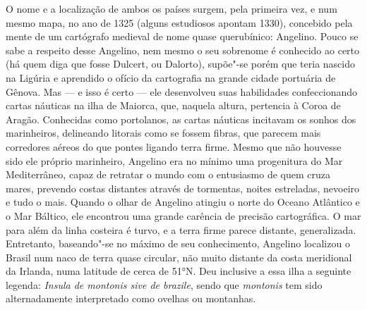 O nome e a localização de ambos os países surgem, pela primeira vez, e
num mesmo mapa, no ano de 1325 (alguns estudiosos apontam 1330),
concebido pela mente de um cartógrafo medieval de nome quase
querubínico: Angelino. Pouco se sabe a respeito desse Angelino, nem
mesmo o seu sobrenome é conhecido ao certo (há quem diga que fosse
Dulcert, ou Dalorto), supõe"-se porém que teria nascido na Ligúria e
aprendido o ofício da cartografia na grande cidade portuária de Gênova.
Mas --- e isso é certo --- ele desenvolveu suas habilidades confeccionando
cartas náuticas na ilha de Maiorca, que, naquela altura, pertencia à
Coroa de Aragão. Conhecidas como portolanos, as cartas náuticas
incitavam os sonhos dos marinheiros, delineando litorais como se fossem
fibras, que parecem mais corredores aéreos do que pontes ligando terra
firme. Mesmo que não houvesse sido ele próprio marinheiro, Angelino era
no mínimo uma progenitura do Mar Mediterrâneo, capaz de retratar o mundo
com o entusiasmo de quem cruza mares, prevendo costas distantes através
de tormentas, noites estreladas, nevoeiro e tudo o mais. Quando o olhar
de Angelino atingiu o norte do Oceano Atlântico e o Mar Báltico, ele
encontrou uma grande carência de precisão cartográfica. O mar para além
da linha costeira é turvo, e a terra firme parece distante,
generalizada. Entretanto, baseando"-se no máximo de seu conhecimento,
Angelino localizou o Brasil num naco de terra quase circular, não muito
distante da costa meridional da Irlanda, numa latitude de cerca de 51°N.
Deu inclusive a essa ilha a seguinte legenda: \textit{Insula de montonis
sive de brazile}, sendo que \textit{montonis} tem sido alternadamente
interpretado como ovelhas ou montanhas.

